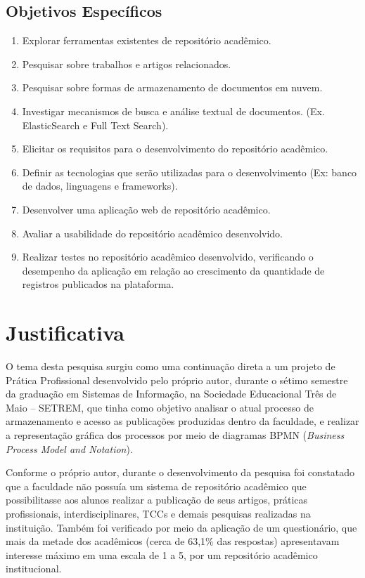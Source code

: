 \subsection{Objetivos Específicos}
\begin{enumerate}
    \item Explorar ferramentas existentes de repositório acadêmico.
    \item Pesquisar sobre trabalhos e artigos relacionados.
    \item Pesquisar sobre formas de armazenamento de documentos em nuvem.
    \item Investigar mecanismos de busca e análise textual de documentos. (Ex. ElasticSearch e Full Text Search).
    \item Elicitar os requisitos para o desenvolvimento do repositório acadêmico.
    \item Definir as tecnologias que serão utilizadas para o desenvolvimento (Ex: banco de dados, linguagens e frameworks).
    \item Desenvolver uma aplicação web de repositório acadêmico.
    \item Avaliar a usabilidade do repositório acadêmico desenvolvido.
    \item Realizar testes no repositório acadêmico desenvolvido, verificando o desempenho da aplicação em relação ao crescimento da quantidade de registros publicados na plataforma.

\end{enumerate}


\section{Justificativa}\label{sec:justification}

O tema desta pesquisa surgiu como uma continuação direta a um projeto
de Prática Profissional desenvolvido pelo próprio autor, durante o sétimo
semestre da graduação em Sistemas de Informação, na Sociedade Educacional
Três de Maio – SETREM, que tinha como objetivo analisar o atual processo
de armazenamento e acesso as publicações produzidas dentro da faculdade,
e realizar a representação gráfica dos processos por meio de diagramas BPMN
(\emph{Business Process Model and Notation}).

Conforme o próprio autor, durante o desenvolvimento da pesquisa foi constatado que a faculdade
não possuía um sistema de repositório acadêmico que possibilitasse aos
alunos realizar a publicação de seus artigos, práticas profissionais,
interdisciplinares, TCCs e demais pesquisas realizadas na instituição.
Também foi verificado por meio da aplicação de um questionário, que
mais da metade dos acadêmicos (cerca de 63,1\% das respostas) apresentavam
interesse máximo em uma escala de 1 a 5, por um repositório acadêmico
institucional.

